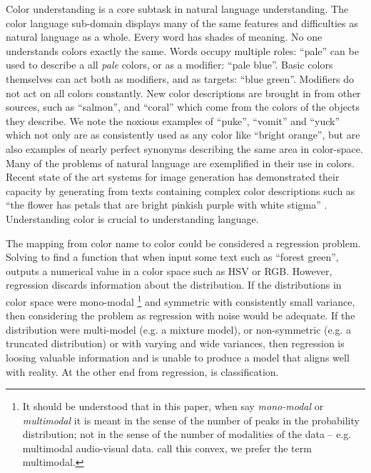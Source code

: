 \documentclass[11pt,letterpaper]{article}
\newcommand{\parencite}{\cite}
\newcommand{\textcite}{\newcite}
\begin{document}
Color understanding is a core subtask in natural language understanding.
The color language sub-domain displays many of the same features and difficulties as natural language as a whole.
Every word has shades of meaning.
No one understands colors exactly the same.
Words occupy multiple roles: ``pale'' can be used to describe a all \emph{pale} colors, or as a modifier: ``pale blue''.
Basic colors themselves can act both as modifiers, and as targets: ``blue green''.
Modifiers do not act on all colors constantly.
New color descriptions are brought in from other sources, such as ``salmon'', and ``coral'' which come from the colors of the objects they describe.
We note the noxious examples of ``puke'', ``vomit'' and ``yuck'' which not only are as consistently used as any color like ``bright orange'', but are also examples of nearly perfect synonyms describing the same area in color-space.
Many of the problems of natural language are exemplified in their use in colors.
Recent state of the art systems for image generation has demonstrated their capacity by generating from texts containing complex color descriptions such as ``the flower has petals that 
are bright pinkish purple with white stigma'' \parencite{reed2016generative, 2015arXiv151102793M}.
Understanding color is crucial to understanding language. 


The mapping from color name to color could be considered a regression problem. Solving to find a function that when input some text such as ``forest green'', outputs a numerical value in a color space such as HSV or RGB.
However, regression discards information about the distribution.
If the distributions in color space were mono-modal
\footnote{It should be understood that in this paper, when say \emph{mono-modal} or \emph{multimodal} it is meant in the sense of the number of peaks in the probability distribution; not in the sense of the number of modalities of the data -- e.g. multimodal audio-visual data. 
\textcite{mcmahan2015bayesian} call this convex, we prefer the term multimodal.
	}
 and symmetric with consistently small variance, then considering the problem as regression with noise would be adequate.
If the distribution were multi-model (e.g. a mixture model), or non-symmetric (e.g. a truncated distribution) or with varying and wide variances, then regression is loosing valuable information and is unable to produce a model that aligns well with reality.
At the other end from regression, is classification.
\end{document}
